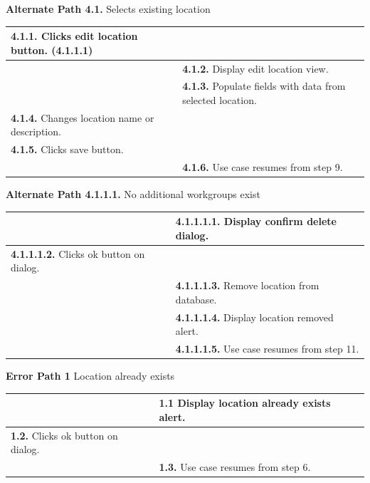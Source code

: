 \documentclass[letterpaper,12pt]{report}
\begin{document}
{\begin{center}
\begin{tabular}{| p{8.5cm} | p{8.5cm} |}
\end{tabular}
\end{center}
\pagebreak
\centering \textbf{Alternate Path 4.1.}
\linebreak Selects existing location
\begin{center}
\xuchead
\begin{tabular}{| p{8.5cm} | p{8.5cm} |}
\hline
\textbf{4.1.1.} Clicks edit location button. (4.1.1.1) & \\
\hline
& \textbf{4.1.2.} Display edit location view. \\
\hline
& \textbf{4.1.3.} Populate fields with data from selected location. \\
\hline
\textbf{4.1.4.} Changes location name or description. &\\
\hline
\textbf{4.1.5.} Clicks save button. &\\
\hline
& \textbf{4.1.6.} Use case resumes from step 9. \\
\hline
\end{tabular}
\end{center}
\pagebreak
\centering \textbf{Alternate Path 4.1.1.1.}
\linebreak No additional workgroups exist
\begin{center}
\xuchead
\begin{tabular}{| p{8.5cm} | p{8.5cm} |}
\hline
& \textbf{4.1.1.1.1.} Display confirm delete dialog. \\
\hline
\textbf{4.1.1.1.2.} Clicks ok button on dialog. & \\
\hline
& \textbf{4.1.1.1.3.} Remove location from database. \\
\hline
& \textbf{4.1.1.1.4.} Display location removed alert. \\
\hline
& \textbf{4.1.1.1.5.} Use case resumes from step 11. \\
\hline
\end{tabular}
\end{center}
\centering \textbf{Error Path 1}
\linebreak Location already exists
\begin{center}
\xuchead
\begin{tabular}{| p{8.5cm} | p{8.5cm} |}
\hline
& \textbf{1.1} Display location already exists alert. \\
\hline
\textbf{1.2.} Clicks ok button on dialog. & \\
\hline
& \textbf{1.3.} Use case resumes from step 6. \\
\hline
\end{tabular}
\end{center}

}
\end{document}
